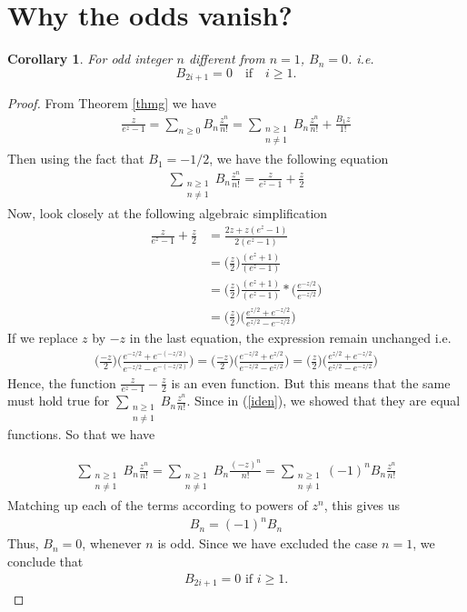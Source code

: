 \documentclass{article}
\newtheorem{cor}[thm]{Corollary}
\theoremstyle{definition}
\begin{document}
\section{Why the  odds vanish?}
\begin{cor}
For odd integer $n$ different from $n=1$, $B_n=0$. i.e. 
\[
B_{2i+1}=0\quad \mbox{if}\quad  i\ge1.
\]
\end{cor}
\begin{proof}
From Theorem \ref{thmg} we have
\begin{align*}
\frac{z}{e^z-1}=\sum_{n\ge0}B_n\frac{z^n}{n!}=\sum_{\substack{n\ge1\\{n\neq 1}}}B_n\frac{z^n}{n!}+\frac{B_1z}{1!}
\end{align*}
Then using the fact that $B_1=-1/2$, we have the following equation
\begin{align}\label{iden}
\sum_{\substack{n\ge1\\{n\neq 1}}}B_n\frac{z^n}{n!}=\frac{z}{e^z-1}+\frac{z}{2}
\end{align}
Now, look closely at the following algebraic simplification
\begin{align*}
\frac{z}{e^z-1}+\frac{z}{2}&=\frac{2z+z(e^z-1)}{2(e^z-1)}\\
&=\biggl(\frac{z}{2}\biggl)\frac{(e^z+1)}{(e^z-1)}\\
&=\biggl(\frac{z}{2}\biggl)\frac{(e^z+1)}{(e^z-1)}*\biggl(\frac{e^{-z/2}}{e^{-z/2}}\biggl)\\
&=\biggl(\frac{z}{2}\biggl)\biggl(\frac{e^{z/2}+e^{-z/2}}{e^{z/2}-e^{-z/2}}\biggl)
\end{align*}
If we replace $z$ by $-z$ in the last equation, the expression remain unchanged i.e.
\begin{align*}
\biggl(\frac{-z}{2}\biggl)\biggl(\frac{e^{-z/2}+e^{-(-z/2)}}{e^{-z/2}-e^{-(-z/2)}}\biggl)=\biggl(\frac{-z}{2}\biggl)
\biggl(\frac{e^{-z/2}+e^{z/2}}{e^{-z/2}-e^{z/2}}\biggl)=\biggl(\frac{z}{2}\biggl)\biggl(\frac{e^{z/2}+e^{-z/2}}{e^{z/2}
-e^{-z/2}}\biggl)
\end{align*}
Hence, the function $\frac{z}{e^z-1}-\frac{z}{2}$ is an even function. But this means that the same must hold true for $ \sum_{\substack{n\ge1\\{n\neq 1}}}B_n\frac{z^n}{n!}$. Since in (\ref{iden}), we showed that they are equal functions. So that we have

\begin{align*}
\sum_{\substack{n\ge1\\{n\neq 1}}}B_n\frac{z^n}{n!}=\sum_{\substack{n\ge1\\{n\neq 1}}}B_n\frac{(-z)^n}{n!}=\sum_{\substack{n\ge1\\{n\neq 1}}}(-1)^nB_n\frac{z^n}{n!}
\end{align*}
Matching up each of the terms according to powers of $z^n$, this gives us
\begin{align*}
B_n=(-1)^nB_n
\end{align*}
Thus, $B_n=0$, whenever $n$ is odd. Since we have excluded the case $n=1$, we conclude that
\begin{align*}
B_{2i+1}=0 \text{ if } i\ge1.
\end{align*}
\end{proof} 
\end{document}

